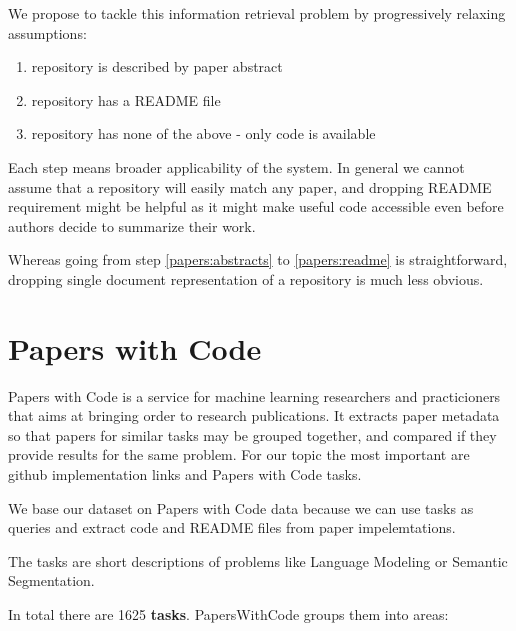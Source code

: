 \documentclass[longabstract,mgr,english]{iithesis}
\begin{document}
We propose to tackle this information retrieval problem by progressively relaxing  assumptions: 

\begin{enumerate}
\item repository \label{papers:abstracts} is described by paper abstract
\item repository \label{papers:readme} has a README file
\item repository \label{papers:code} has none of the above - only code is available 
\end{enumerate}

Each step means broader applicability of the system. In
general we cannot assume that a repository will easily match any paper, and
dropping README requirement might be helpful as it might make useful code
accessible even before authors decide to summarize their work.

Whereas going from step \ref{papers:abstracts} to \ref{papers:readme} is
straightforward, dropping single document representation of a repository is much
less obvious.

\section{Papers with Code}

Papers with Code is a service for machine learning researchers and practicioners
that aims at bringing order to research publications. It extracts paper metadata
so that papers for similar tasks may be grouped together, and compared if they
provide results for the same problem. For our topic the most important are
github implementation links and Papers with Code tasks.

We base our dataset on Papers with Code data because we can use tasks as queries
and extract code and
README files from paper impelemtations.

The tasks are short descriptions of problems like Language Modeling or Semantic Segmentation.

In total there are 1625 \textbf{tasks}. PapersWithCode groups them into areas:
\end{document}
